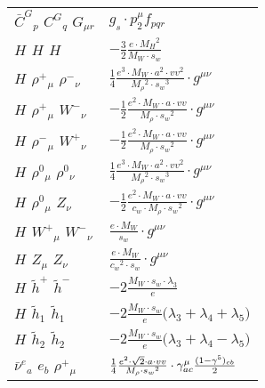 \begin{center}
\begin{tabular}{|l|l|}
$\bar{C}^G{}_{p }$ \phantom{-} $C^G{}_{q }$ \phantom{-} ${G}_{\mu r }$ \phantom{-}  &
	$ g_s\cdot p_2^\mu f_{p q r} $\\[2mm]
${H}_{}$ \phantom{-} ${H}_{}$ \phantom{-} ${H}_{}$ \phantom{-}  &
	$-\frac{3}{2}\frac{ e \cdot M_H{}^2 }{ M_W \cdot s_w}$\\[2mm]
${H}_{}$ \phantom{-} $\rho^+{}_{\mu }$ \phantom{-} $\rho^-{}_{\nu }$ \phantom{-}  &
	$\frac{1}{4}\frac{ e{}^3  \cdot M_W \cdot a{}^2  \cdot vv{}^2 }{ M_{\rho}{}^2  \cdot s_w{}^3 }\cdot g^{\mu \nu} $\\[2mm]
${H}_{}$ \phantom{-} $\rho^+{}_{\mu }$ \phantom{-} $W^-{}_{\nu }$ \phantom{-}  &
	$-\frac{1}{2}\frac{ e{}^2  \cdot M_W \cdot a \cdot vv}{ M_{\rho} \cdot s_w{}^2 }\cdot g^{\mu \nu} $\\[2mm]
${H}_{}$ \phantom{-} $\rho^-{}_{\mu }$ \phantom{-} $W^+{}_{\nu }$ \phantom{-}  &
	$-\frac{1}{2}\frac{ e{}^2  \cdot M_W \cdot a \cdot vv}{ M_{\rho} \cdot s_w{}^2 }\cdot g^{\mu \nu} $\\[2mm]
${H}_{}$ \phantom{-} $\rho^0{}_{\mu }$ \phantom{-} $\rho^0{}_{\nu }$ \phantom{-}  &
	$\frac{1}{4}\frac{ e{}^3  \cdot M_W \cdot a{}^2  \cdot vv{}^2 }{ M_{\rho}{}^2  \cdot s_w{}^3 }\cdot g^{\mu \nu} $\\[2mm]
${H}_{}$ \phantom{-} $\rho^0{}_{\mu }$ \phantom{-} ${Z}_{\nu }$ \phantom{-}  &
	$-\frac{1}{2}\frac{ e{}^2  \cdot M_W \cdot a \cdot vv}{ c_w \cdot M_{\rho} \cdot s_w{}^2 }\cdot g^{\mu \nu} $\\[2mm]
${H}_{}$ \phantom{-} $W^+{}_{\mu }$ \phantom{-} $W^-{}_{\nu }$ \phantom{-}  &
	$\frac{ e \cdot M_W}{ s_w}\cdot g^{\mu \nu} $\\[2mm]
${H}_{}$ \phantom{-} ${Z}_{\mu }$ \phantom{-} ${Z}_{\nu }$ \phantom{-}  &
	$\frac{ e \cdot M_W}{ c_w{}^2  \cdot s_w}\cdot g^{\mu \nu} $\\[2mm]
${H}_{}$ \phantom{-} $\widetilde{h}^+{}_{}$ \phantom{-} $\widetilde{h}^-{}_{}$ \phantom{-}  &
	$-2\frac{ M_W \cdot s_w \cdot \lambda_3}{ e}$\\[2mm]
${H}_{}$ \phantom{-} $\widetilde{h}_1{}_{}$ \phantom{-} $\widetilde{h}_1{}_{}$ \phantom{-}  &
	$-2\frac{ M_W \cdot s_w}{ e}\big( \lambda_3+ \lambda_4+ \lambda_5\big)$\\[2mm]
${H}_{}$ \phantom{-} $\widetilde{h}_2{}_{}$ \phantom{-} $\widetilde{h}_2{}_{}$ \phantom{-}  &
	$-2\frac{ M_W \cdot s_w}{ e}\big( \lambda_3+ \lambda_4- \lambda_5\big)$\\[2mm]
$\bar{\nu}^e{}_{a }$ \phantom{-} $e{}_{b }$ \phantom{-} $\rho^+{}_{\mu }$ \phantom{-}  &
	$\frac{1}{4}\frac{ e{}^2  \cdot\sqrt{2} \cdot a \cdot vv}{ M_{\rho} \cdot s_w{}^2 }\cdot \gamma_{a c}^\mu {(1-\gamma^5)_{c b}\over 2} $\\[2mm]

\end{tabular}
\end{center}
